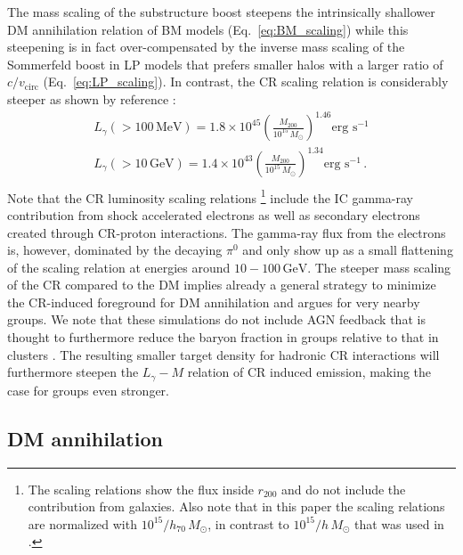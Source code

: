 \documentclass[10pt,aps,pra,reprint,amsmath,amsfonts,amssymb,showpacs,nofootinbib,floatfix]{revtex4-1}
\newcommand{\rmn}{\mathrm}
\newcommand{\msun}{M_\odot}
\newcommand{\mev}{\rmn{MeV}}
\newcommand{\gev}{\rmn{GeV}}
\newcommand{\rvir}{r_{200}}
\newcommand{\mvir}{M_{200}}
\begin{document}
The mass scaling of the substructure boost steepens the intrinsically
shallower DM annihilation relation of BM models
(Eq.~\ref{eq:BM_scaling}) while this steepening is in fact
over-compensated by the inverse mass scaling of the Sommerfeld boost
in LP models that prefers smaller halos with a larger ratio of
$c/v_\mathrm{circ}$ (Eq.~\ref{eq:LP_scaling}). In contrast, the CR
scaling relation is considerably steeper as shown by reference
\cite{2010MNRAS.409..449P}:
\begin{eqnarray}
L_{\gamma}(>100\,\mev) = 1.8\times10^{45}
\left(\frac{\mvir}{10^{15}\,\msun}\right)^{1.46}\mbox{erg~s}^{-1}\nonumber\\
L_{\gamma}(>10\,\gev)  = 1.4\times10^{43}
\left(\frac{\mvir}{10^{15}\,\msun}\right)^{1.34}\mbox{erg~s}^{-1}\,.\nonumber\\
\end{eqnarray}
Note that the CR luminosity scaling relations \footnote{The scaling
  relations show the flux inside $\rvir$ and do not include the
  contribution from galaxies. Also note that in this paper the scaling
  relations are normalized with $10^{15}/h_{70}\,\msun$, in contrast
  to $10^{15}/h\,\msun$ that was used in \cite{2010MNRAS.409..449P}.}
include the IC gamma-ray contribution from shock accelerated electrons
as well as secondary electrons created through CR-proton
interactions. The gamma-ray flux from the electrons is, however,
dominated by the decaying $\pi^0$ and only show up as a small
flattening of the scaling relation at energies around
$10-100\,\gev$. The steeper mass scaling of the CR compared to the DM
implies already a general strategy to minimize the CR-induced
foreground for DM annihilation and argues for very nearby groups. We
note that these simulations do not include AGN feedback that is
thought to furthermore reduce the baryon fraction in groups relative
to that in clusters \cite{2008ApJ...687L..53P}. The resulting smaller
target density for hadronic CR interactions will furthermore steepen
the $L_\gamma-M$ relation of CR induced emission, making the case for
groups even stronger.

\subsection{DM annihilation}
\end{document}
